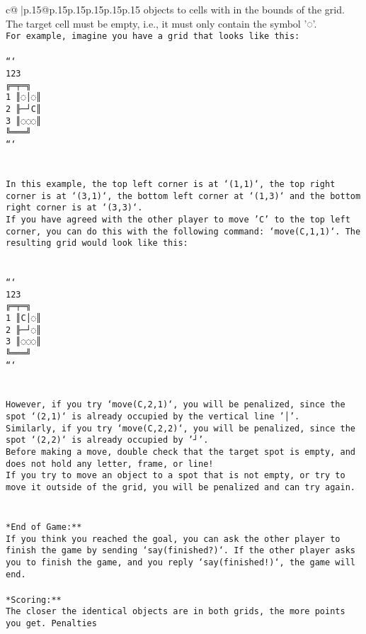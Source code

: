 \documentclass{article}
\begin{document}
{\begin{supertabular}{c@{$\;$}|p{.15\linewidth}@{}p{.15\linewidth}p{.15\linewidth}p{.15\linewidth}p{.15\linewidth}p{.15\linewidth}}
{{{objects to cells with in the bounds of the grid. The target cell must be empty, i.e., it must only contain the symbol '◌'.\\ \tt * For example, imagine you have a grid that looks like this: \\ \tt \\ \tt ```\\ \tt     123\\ \tt    ╔═╤═╗\\ \tt  1 ║◌│◌║\\ \tt  2 ╟─┘C║\\ \tt  3 ║◌◌◌║\\ \tt    ╚═══╝\\ \tt ```\\ \tt \\ \tt \\ \tt * In this example, the top left corner is at `(1,1)`, the top right corner is at `(3,1)`, the bottom left corner at `(1,3)` and the bottom right corner is at `(3,3)`.\\ \tt * If you have agreed with the other player to move 'C' to the top left corner, you can do this with the following command: `move(C,1,1)`. The resulting grid would look like this: \\ \tt \\ \tt \\ \tt ```\\ \tt     123\\ \tt    ╔═╤═╗\\ \tt  1 ║C│◌║\\ \tt  2 ╟─┘◌║\\ \tt  3 ║◌◌◌║\\ \tt    ╚═══╝\\ \tt ```\\ \tt \\ \tt \\ \tt * However, if you try `move(C,2,1)`, you will be penalized, since the spot `(2,1)` is already occupied by the vertical line '│'.\\ \tt * Similarly, if you try `move(C,2,2)`, you will be penalized, since the spot `(2,2)` is already occupied by '┘'.\\ \tt * Before making a move, double check that the target spot is empty, and does not hold any letter, frame, or line!\\ \tt * If you try to move an object to a spot that is not empty, or try to move it outside of the grid, you will be penalized and can try again.\\ \tt \\ \tt \\ \tt **End of Game:**\\ \tt If you think you reached the goal, you can ask the other player to finish the game by sending `say(finished?)`. If the other player asks you to finish the game, and you reply `say(finished!)`, the game will end.\\ \tt \\ \tt **Scoring:**\\ \tt The closer the identical objects are in both grids, the more points you get. Penalties }}}
\end{supertabular}}
\end{document}
